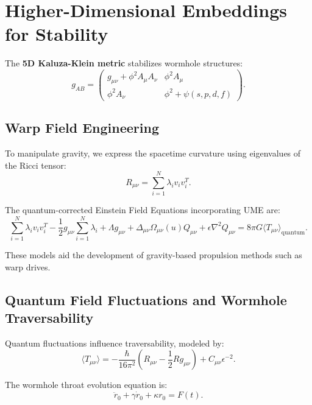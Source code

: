 \documentclass{article}
\theoremstyle{plain}
\begin{document}
\section{Higher-Dimensional Embeddings for Stability}
The \textbf{5D Kaluza-Klein metric} stabilizes wormhole structures:
\begin{equation}
g_{AB} =
\begin{pmatrix}
g_{\mu\nu} + \phi^2 A_{\mu} A_{\nu} & \phi^2 A_{\mu} \\
\phi^2 A_{\nu} & \phi^2 + \psi(s, p, d, f)
\end{pmatrix}.
\end{equation}

\subsection{Warp Field Engineering}

To manipulate gravity, we express the spacetime curvature using eigenvalues of the Ricci tensor:
\begin{equation}
R_{\mu\nu} = \sum_{i=1}^{N} \lambda_i v_i v_i^T.
\end{equation}

The quantum-corrected Einstein Field Equations incorporating UME are:
\begin{equation}
\sum_{i=1}^{N} \lambda_i v_i v_i^T - \frac{1}{2} g_{\mu\nu} \sum_{i=1}^{N} \lambda_i + \Lambda g_{\mu\nu} + \Delta_{\mu\nu} \Omega_{\mu\nu} (u) Q_{\mu\nu} + \epsilon \nabla^2 Q_{\mu\nu} = 8 \pi G \langle T_{\mu\nu} \rangle_{\text{quantum}}.
\end{equation}

These models aid the development of gravity-based propulsion methods such as warp drives.

\subsection{Quantum Field Fluctuations and Wormhole Traversability}
Quantum fluctuations influence traversability, modeled by:
\begin{equation}
\langle T_{\mu\nu} \rangle = - \frac{\hbar}{16\pi^2} \left( R_{\mu\nu} - \frac{1}{2} R g_{\mu\nu} \right) + C_{\mu\nu} \epsilon^{-2}.
\end{equation}

The wormhole throat evolution equation is:
\begin{equation}
\ddot{r}_0 + \gamma \dot{r}_0 + \kappa r_0 = F(t).
\end{equation}
\end{document}
